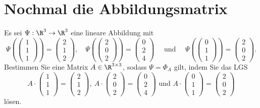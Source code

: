 \section{Nochmal die Abbildungsmatrix}
Es sei $\Psi: \R^3 \to \R^3$ eine lineare Abbildung mit
$$
\Psi(\begin{pmatrix}1\\1\\1 \end{pmatrix}) = \begin{pmatrix}2 \\ 1 \\ 2 \end{pmatrix}, \quad \Psi(\begin{pmatrix} 2 \\ 0\\ 2 \end{pmatrix}) = \begin{pmatrix}0\\2\\4 \end{pmatrix} \quad \text{ und } \quad \Psi(\begin{pmatrix} 0\\1\\1\end{pmatrix} )= \begin{pmatrix} 2 \\ 0 \\ 2\end{pmatrix}.
$$
Bestimmen Sie eine Matrix $A \in \R^{3\times 3}$, sodass $\Psi=\Phi_A$ gilt, indem Sie das LGS
$$
A\cdot \begin{pmatrix}1\\1\\1 \end{pmatrix}= \begin{pmatrix}2 \\ 1 \\ 2 \end{pmatrix},\ 
A\cdot \begin{pmatrix}2\\0\\2 \end{pmatrix}= \begin{pmatrix}0 \\ 2 \\ 4 \end{pmatrix} \text{ und }
A\cdot \begin{pmatrix}0\\1\\1 \end{pmatrix}= \begin{pmatrix}2 \\ 0 \\ 2 \end{pmatrix} 
$$
lösen. 

